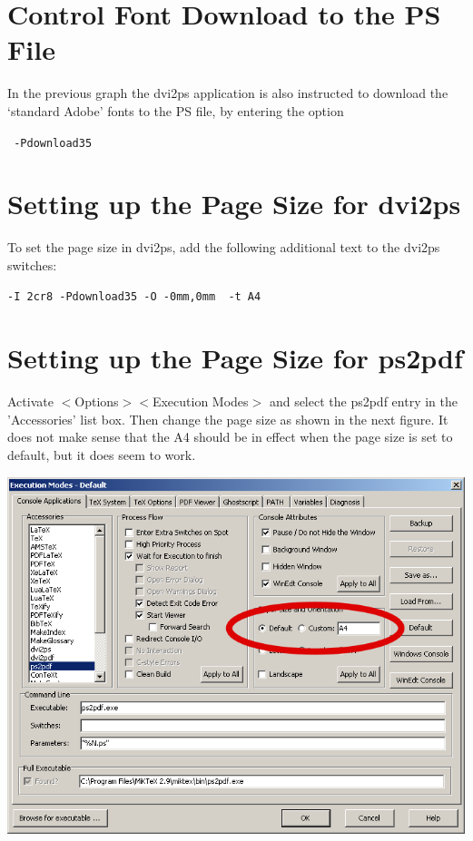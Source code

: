 \section{Control Font Download to the PS File}

In the previous graph the dvi2ps application is also instructed to download the `standard Adobe' fonts to the PS file, by entering the option

\lstinline{ -Pdownload35}


\section{Setting up the Page Size for dvi2ps}

To set the page size in dvi2ps, add the following additional text to the dvi2ps switches:

\lstinline{-I 2cr8 -Pdownload35 -O -0mm,0mm  -t A4}


\section{Setting up the Page Size for ps2pdf}

Activate
$<$Options$>$$<$Execution Modes$>$ and select the ps2pdf entry in the 'Accessories' list box. Then change the page size as shown in the next figure. It does not make sense that the A4 should be in effect when the page size is set to default, but it does seem to work.

\centerline{\includegraphics[bb= 0 0 696 543,width=\textwidth]{eps/ps2pdfpagesize.png}}

